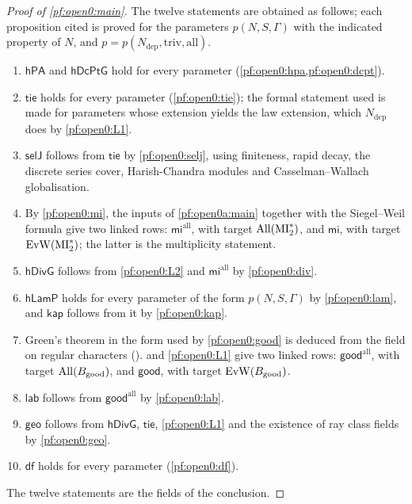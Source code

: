 \begin{proof}[Proof of \cref{pf:open0:main}]
The twelve statements are obtained as follows; each proposition cited is proved for the parameters $p(N,S,\Gamma)$ with
the indicated property of $N$, and $p=p(N_{\mathrm{dep}},\mathrm{triv},\mathrm{all})$.
\begin{enumerate}[label=\arabic*.]
\item $\mathsf{hPA}$ and $\mathsf{hDcPtG}$ hold for every parameter (\cref{pf:open0:hpa,pf:open0:dcpt}).
\item $\mathsf{tie}$ holds for every parameter (\cref{pf:open0:tie}); the formal statement used is made for parameters whose
extension yields the law extension, which $N_{\mathrm{dep}}$ does by \ref{pf:open0:L1}.
\item $\mathsf{selJ}$ follows from $\mathsf{tie}$ by \cref{pf:open0:selj}, using finiteness, rapid decay, the discrete
series cover, Harish-Chandra modules and Casselman--Wallach globalisation.
\item By \cref{pf:open0:mi}, the inputs of \cref{pf:open0a:main} together with the Siegel--Weil formula give two linked
rows: $\mathsf{mi}^{\mathrm{all}}$, with target $\mathrm{All}(\mathrm{MI}^{*}_{2})$, and $\mathsf{mi}$, with target
$\mathrm{EvW}(\mathrm{MI}^{*}_{2})$; the latter is the multiplicity statement.
\item $\mathsf{hDivG}$ follows from \ref{pf:open0:L2} and $\mathsf{mi}^{\mathrm{all}}$ by \cref{pf:open0:div}.
\item $\mathsf{hLamP}$ holds for every parameter of the form $p(N,S,\Gamma)$ by \cref{pf:open0:lam}, and $\mathsf{kap}$ follows from
it by \cref{pf:open0:kap}.
\item Green's theorem in the form used by \cref{pf:open0:good} is deduced from the field on regular characters
().  and \ref{pf:open0:L1} give two linked rows:
$\mathsf{good}^{\mathrm{all}}$, with target $\mathrm{All}(B_{\mathrm{good}})$, and $\mathsf{good}$, with target
$\mathrm{EvW}(B_{\mathrm{good}})$.
\item $\mathsf{lab}$ follows from $\mathsf{good}^{\mathrm{all}}$ by \cref{pf:open0:lab}.
\item $\mathsf{geo}$ follows from $\mathsf{hDivG}$, $\mathsf{tie}$, \ref{pf:open0:L1} and the existence of ray class fields by
\cref{pf:open0:geo}.
\item $\mathsf{df}$ holds for every parameter (\cref{pf:open0:df}).
\end{enumerate}
The twelve statements are the fields of the conclusion.
\end{proof}

